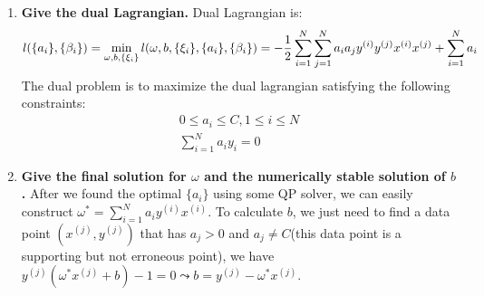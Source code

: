 \documentclass[paper=a4, fontsize=11pt]{scrartcl} %
\numberwithin{equation}{section} %
\numberwithin{figure}{section} %
\numberwithin{table}{section} %
\begin{document}
\begin{enumerate}[a]
\item \textbf{Give the dual Lagrangian.}
  Dual Lagrangian is:
  \[
  l(\{a_i\}, \{\beta_i\}) = \min_{\omega, b, \{\xi_i\}} l(\omega, b, \{\xi_i\}, \{a_i\}, \{\beta_i\}) = -\frac{1}{2} \sum_{i=1}^N\sum_{j=1}^N a_i a_j y^{(i)} y^{(j)} x^{(i)} x^{(j)} + \sum_{i=1}^N a_i\\
  \]
  The dual problem is to maximize the dual lagrangian satisfying the following constraints:
  \[
  \begin{split}
    0 \leq a_i \leq C, 1 \leq i \leq N\\
    \sum_{i=1}^{N} a_i y_i = 0
  \end{split}
  \]

\item \textbf{Give the final solution for $\omega$ and the numerically stable solution of $b$.}
  After we found the optimal $\{a_i\}$ using some QP solver, we can easily construct $\omega^{*} = \sum_{i=1}^N a_i y^{(i)} x^{(i)}$.
  To calculate $b$, we just need to find a data point $(x^{(j)}, y^{(j)})$ that has $a_j > 0$ and $a_j \neq C$(this data point is a supporting but not erroneous point), we have $y^{(j)}(\omega^{*} x^{(j)} + b) - 1 = 0 \leadsto b = y^{(j)} - \omega^{*}x^{(j)}$.
\end{enumerate}
\end{document}
